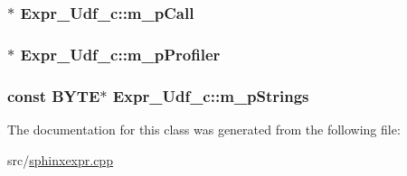\hypertarget{classExpr__Udf__c_a28d34f3e5f7bd7b0cf8e61224c807e86}{
\subsubsection[{m\-\_\-p\-Call}]{$\ast$ Expr\-\_\-\-Udf\-\_\-c\-::m\-\_\-p\-Call\hspace{0.3cm}{\ttfamily [protected]}}}\label{classExpr__Udf__c_a28d34f3e5f7bd7b0cf8e61224c807e86}
\hypertarget{classExpr__Udf__c_acfcfff29850d1fe1f59c9232cd7ecd7e}{
\subsubsection[{m\-\_\-p\-Profiler}]{$\ast$ Expr\-\_\-\-Udf\-\_\-c\-::m\-\_\-p\-Profiler\hspace{0.3cm}{\ttfamily [protected]}}}\label{classExpr__Udf__c_acfcfff29850d1fe1f59c9232cd7ecd7e}
\hypertarget{classExpr__Udf__c_af0496f9dd34e5cd259cc84285dff57e0}{
\subsubsection[{m\-\_\-p\-Strings}]{\setlength{\rightskip}{0pt plus 5cm}const {\bf B\-Y\-T\-E}$\ast$ Expr\-\_\-\-Udf\-\_\-c\-::m\-\_\-p\-Strings\hspace{0.3cm}{\ttfamily [protected]}}}\label{classExpr__Udf__c_af0496f9dd34e5cd259cc84285dff57e0}


The documentation for this class was generated from the following file\-:\begin{DoxyCompactItemize}
\item 
src/\hyperlink{sphinxexpr_8cpp}{sphinxexpr.\-cpp}\end{DoxyCompactItemize}
